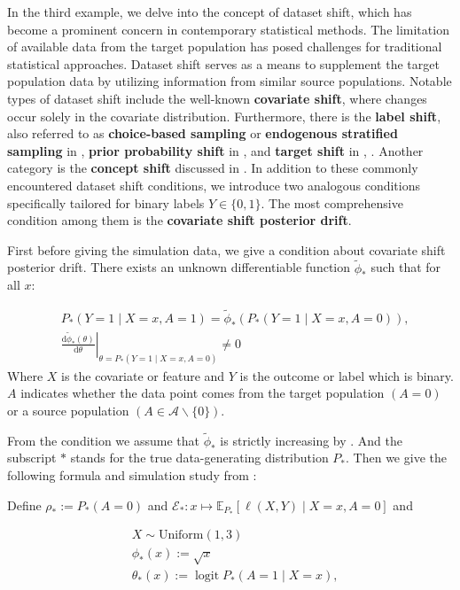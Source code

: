 \documentclass[11pt]{article}
\begin{document}
\begin{example}

In the third example, we delve into the concept of dataset shift, which has become a prominent concern in contemporary statistical methods. The limitation of available data from the target population has posed challenges for traditional statistical approaches. Dataset shift serves as a means to supplement the target population data by utilizing information from similar source populations. Notable types of dataset shift include the well-known \textbf{covariate shift}, where changes occur solely in the covariate distribution. Furthermore, there is the \textbf{label shift}, also referred to as \textbf{choice-based sampling} or \textbf{endogenous stratified sampling} in \cite{manski1977estimation}, \textbf{prior probability shift} in \cite{storkey2009training}, and \textbf{target shift} in \cite{scott2019generalized}, \cite{zhang2013domain}. Another category is the \textbf{concept shift} discussed in \cite{zhang2013domain}. In addition to these commonly encountered dataset shift conditions, we introduce two analogous conditions specifically tailored for binary labels $Y \in \{0,1\}$. The most comprehensive condition among them is the \textbf{covariate shift posterior drift}.

First before giving the simulation data, we give a condition about covariate shift posterior drift. There exists an unknown differentiable function $\tilde{\phi}_*$ such that for all $x$:

$$
\begin{aligned}
& P_*(Y=1 \mid X=x, A=1)=\tilde{\phi}_*\left(P_*(Y=1 \mid X=x, A=0)\right), \\
& \left.\frac{\mathrm{d} \tilde{\phi}_*(\theta)}{\mathrm{d} \theta}\right|_{\theta=P_*(Y=1 \mid X=x, A=0)} \neq 0
\end{aligned}
$$
Where $X$ is the covariate or feature and $Y$ is the outcome or label which is binary. $A$ indicates whether the data point comes from the target population $(A=0)$ or a source population $(A \in \mathcal{A} \backslash\{0\})$.

From the condition we assume that $\tilde{\phi}_*$ is strictly increasing by \cite{scott2019generalized}. And the subscript $*$ stands for the true data-generating distribution $P_*$. Then we give the following formula and simulation study from \cite{qiu2023efficient}:

Define $\rho_*:=P_*(A=0)$ and $\mathcal{E}_*: x \mapsto \mathbb{E}_{P_*}[\ell(X, Y) \mid X=x, A=0]$ and

\begin{equation}
\begin{aligned}
& X {\sim} \text{Uniform}(1,3) \\
& \phi_*(x) := \sqrt{x} \\
& \theta_*(x) :=\operatorname{logit} P_*(A=1 \mid X=x), \\
\end{aligned}
\end{equation}
\label{eg:shift}
\end{example}
\end{document}
